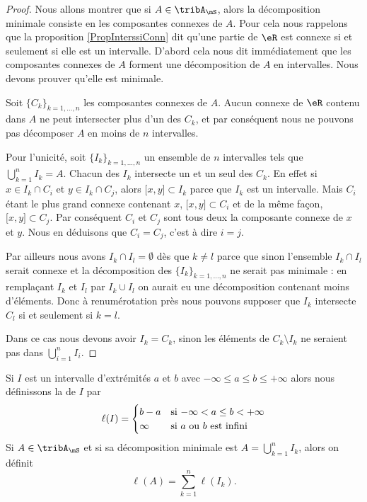 \begin{proof}
    Nous allons montrer que si \( A\in\tribA_{\mS}\), alors la décomposition minimale consiste en les composantes connexes de \( A\). Pour cela nous rappelons que la proposition \ref{PropInterssiConn} dit qu'une partie de \( \eR\) est connexe si et seulement si elle est un intervalle. D'abord cela nous dit immédiatement que les composantes connexes de \( A\) forment une décomposition de \( A\) en intervalles. Nous devons prouver qu'elle est minimale.

    Soit \( \{ C_k \}_{k=1,\ldots, n}\) les composantes connexes de \( A\). Aucun connexe de \( \eR\) contenu dans \( A\) ne peut intersecter plus d'un des \( C_k\), et par conséquent nous ne pouvons pas décomposer \( A\) en moins de \( n\) intervalles. 
    
    Pour l'unicité, soit \( \{ I_k \}_{k=1,\ldots, n}\) un ensemble de \( n\) intervalles tels que \( \bigcup_{k=1}^nI_k=A\). Chacun des \( I_k\) intersecte un et un seul des \( C_k\). En effet si \( x\in I_k\cap C_i\) et \( y\in I_k\cap C_j\), alors \( \mathopen[ x , y \mathclose]\subset I_k\) parce que \( I_k\) est un intervalle. Mais \( C_i\) étant le plus grand connexe contenant \( x\), \( \mathopen[ x , y \mathclose]\subset C_i\) et de la même façon, \( \mathopen[ x , y \mathclose]\subset C_j\). Par conséquent \( C_i\) et \( C_j\) sont tous deux la composante connexe de \( x\) et \( y\). Nous en déduisons que \( C_i=C_j\), c'est à dire \( i=j\).

    Par ailleurs nous avons \( I_k\cap I_l=\emptyset\) dès que \( k\neq l\) parce que sinon l'ensemble \( I_k\cap I_l\) serait connexe et la décomposition des \( \{ I_k \}_{k=1,\ldots, n} \) ne serait pas minimale : en remplaçant \( I_k\) et \( I_l\) par \( I_k\cup I_l\) on aurait eu une décomposition contenant moins d'éléments. Donc à renumérotation près nous pouvons supposer que \( I_k\) intersecte \( C_l\) si et seulement si \( k=l\).

    Dans ce cas nous devons avoir \( I_k=C_k\), sinon les éléments de \( C_k\setminus I_k\) ne seraient pas dans \( \bigcup_{i=1}^nI_i\).
\end{proof}

\begin{definition}
    Si \( I\) est un intervalle d'extrémités \( a\) et \( b\) avec \( -\infty\leq a\leq b\leq +\infty\) alors nous définissons la  de \( I\) par
    \begin{equation}
        \ell(I)=\begin{cases}
            b-a    &   \text{si \( -\infty<a\leq b< +\infty\)}\\
            \infty    &    \text{si \( a\) ou \( b\) est infini}
        \end{cases}
    \end{equation}
    Si \( A\in\tribA_{\mS}\) et si sa décomposition minimale est \( A=\bigcup_{k=1}^nI_k\), alors on définit
    \begin{equation}
        \ell(A)=\sum_{k=1}^n\ell(I_k).
    \end{equation}
\end{definition}


